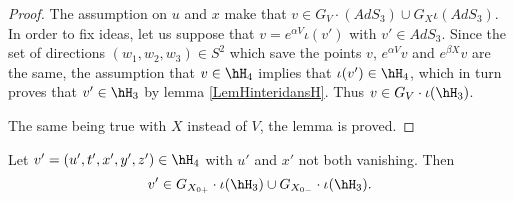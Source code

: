 \begin{proof}
The assumption on $u$ and $x$ make that $v\in G_V\cdot(AdS_3)\cup G_X\iota(AdS_3)$. In order to fix ideas, let us suppose that $v= e^{\alpha V}\iota(v')$ with $v'\in AdS_3$. Since the set of directions $(w_1,w_2,w_3)\in S^2$ which save the points $v$, $ e^{\alpha V}v$ and $ e^{\beta X}v$ are the same, the assumption that $v\in\hH_4$ implies that $\iota(v')\in \hH_4$, which in turn proves that $v'\in \hH_3$ by lemma \ref{LemHinteridansH}. Thus $v\in G_V\cdot\iota(\hH_3)$.

The same being true with $X$ instead of $V$, the lemma is proved.
\end{proof}

\begin{proposition}		\label{PropovHhnonXYzero}
	Let $v'=(u',t',x',y',z')\in\hH_4$ with $u'$ and $x'$ not both vanishing. Then
	\begin{equation}
		v'\in G_{X_{0+}}\cdot \iota(\hH_3)\cup G_{X_{0-}}\cdot \iota(\hH_3).
	\end{equation}
\end{proposition}


